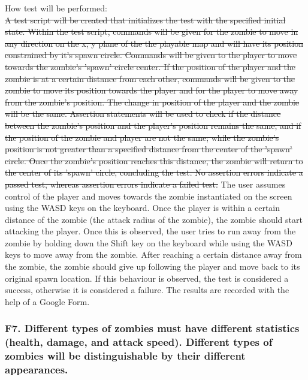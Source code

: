 \documentclass[12pt, titlepage]{article}
\DeclareRobustCommand{\hsout}[1]{\texorpdfstring{\sout{#1}}{#1}}
\begin{document}
\begin{enumerate}
How test will be performed:\\ \hsout{A test script will be created that initializes the test with the specified initial state. Within the test script, commands will be given for the zombie to move in any direction on the x, y plane of the the playable map and will have its position constrained by it's spawn circle. Commands will be given to the player to move towards the zombie's 'spawn' circle center. If the position of the player and the zombie is at a certain distance from each other, commands will be given to the zombie to move its position towards the player and for the player to move away from the zombie's position. The change in position of the player and the zombie will be the same. Assertion statements will be used to check if the distance between the zombie's position and the player's position remains the same, and if the position of the zombie and player are not the same; while the zombie's position is not greater than a specified distance from the center of the 'spawn' circle. Once the zombie's position reaches this distance, the zombie will return to the center of its 'spawn' circle, concluding the test. No assertion errors indicate a passed test, whereas assertion errors indicate a failed test.}
{\color{magenta}  The user assumes control of the player and moves towards the zombie instantiated on the screen using the WASD keys on the keyboard. Once the player is within a certain distance of the zombie (the attack radius of the zombie), the zombie should start attacking the player. Once this is observed, the user tries to run away from the zombie by holding down the Shift key on the keyboard while using the WASD keys to move away from the zombie. After reaching a certain distance away from the zombie, the zombie should give up following the player and move back to its original spawn location. If this behaviour is observed, the test is considered a success, otherwise it is considered a failure. The results are recorded with the help of a Google Form.}\\

\end{enumerate}

\subsubsection{{\color{magenta} F7.} Different types of zombies must have different statistics (health, damage, {\color{magenta} and attack speed). Different types of zombies will be distinguishable by their different appearances.}} 
\end{document}
